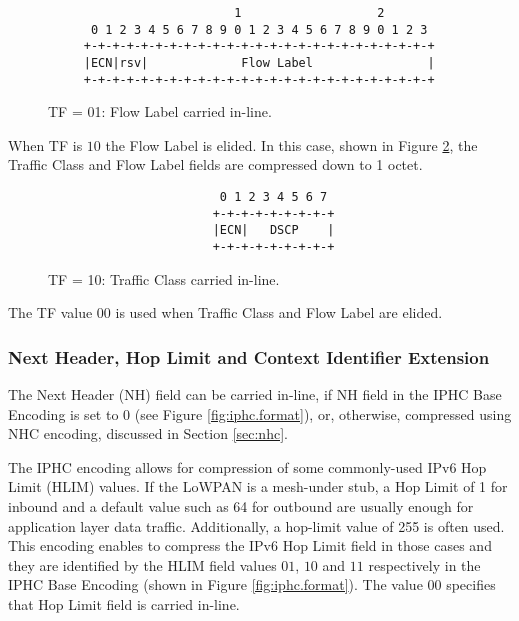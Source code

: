 \documentclass[12pt, titlepage, a4paper]{report}
\newenvironment{mylisting}
{\begin{list}{}{\setlength{\leftmargin}{1em}}\item\footnotesize}
{\end{list}}
\begin{document}
\begin{figure}[htp]
\begin{mylisting}
\begin{verbatim}
                          1                   2
      0 1 2 3 4 5 6 7 8 9 0 1 2 3 4 5 6 7 8 9 0 1 2 3
     +-+-+-+-+-+-+-+-+-+-+-+-+-+-+-+-+-+-+-+-+-+-+-+-+
     |ECN|rsv|             Flow Label                |
     +-+-+-+-+-+-+-+-+-+-+-+-+-+-+-+-+-+-+-+-+-+-+-+-+
\end{verbatim}
\end{mylisting}
\caption{TF = 01: Flow Label carried in-line.}\label{fig:tf.01}
\end{figure}

When TF is $10$ the Flow Label is elided. In this case, shown in Figure \ref{fig:tf.10}, the Traffic Class and Flow Label fields are compressed down to 1 octet.

\begin{figure}[htp]
\begin{mylisting}
\begin{verbatim}
                        0 1 2 3 4 5 6 7
                       +-+-+-+-+-+-+-+-+
                       |ECN|   DSCP    |
                       +-+-+-+-+-+-+-+-+
\end{verbatim}
\end{mylisting}
\caption{TF = 10: Traffic Class carried in-line.}\label{fig:tf.10}
\end{figure}

The TF value $00$ is used when Traffic Class and Flow Label are elided.           

\subsubsection{Next Header, Hop Limit and Context Identifier Extension}
The Next Header (NH) field can be carried in-line, if NH field in the IPHC Base Encoding is set to $0$ (see Figure \ref{fig:iphc.format}), or, otherwise, compressed using NHC encoding, discussed in Section \ref{sec:nhc}.

The IPHC encoding allows for compression of some commonly-used IPv6 Hop Limit (HLIM) values.  If the LoWPAN is a mesh-under stub, a Hop Limit of 1 for inbound and a default value such as 64 for outbound are usually enough for application layer data traffic.  Additionally, a hop-limit value of 255 is often used.  This encoding enables to compress the IPv6 Hop Limit field in those cases and they are identified by the HLIM field values $01$, $10$ and $11$ respectively in the IPHC Base Encoding (shown in Figure \ref{fig:iphc.format}). The value $00$ specifies that Hop Limit field is carried in-line.
\end{document}
